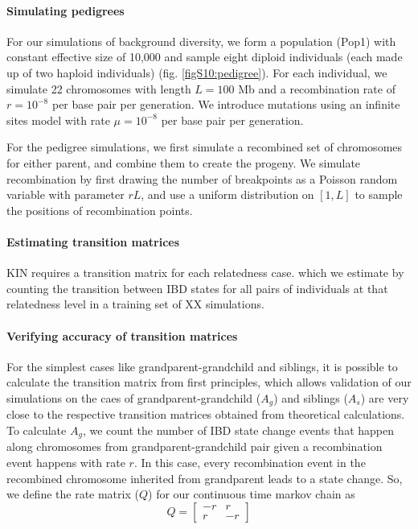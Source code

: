\documentclass[12pt, letterpaper]{article}
\begin{document}
\paragraph{Simulating pedigrees}

For our simulations of background diversity, we form a population (Pop1) with constant effective size of 10,000 and sample eight diploid individuals (each made up of two haploid individuals) (fig. \ref{figS10:pedigree}). For each individual, we simulate 22 chromosomes with length $L=100$ Mb and a recombination rate of $r=10^{-8}$ per base pair per generation. We introduce mutations using an infinite sites model with rate  $\mu= 10^{-8}$ per base pair per generation. 

For the pedigree simulations, we first simulate a recombined set of chromosomes for either parent, and combine them to create the progeny. We simulate recombination by first drawing the number of breakpoints as a  Poisson random variable with parameter $rL$, and use a uniform distribution on $[1, L]$ to sample the positions of recombination points. 

\paragraph{Estimating transition matrices}
KIN requires a transition matrix for each relatedness case. which we estimate  by counting the transition between IBD states for all pairs of individuals at that relatedness level in a training set of XX simulations.

\paragraph{Verifying accuracy of transition matrices}\label{A_ver}
For the simplest cases like grandparent-grandchild and siblings, it is possible to calculate the transition matrix from first principles, which allows validation of our simulations on the caes of grandparent-grandchild ($A_g$) and siblings ($A_s$) are very close to the respective transition matrices obtained from theoretical calculations. To calculate $A_g$, we count the number of IBD state change events that happen along chromosomes from grandparent-grandchild pair given a recombination event happens with rate $r$. In this case, every recombination event in the recombined chromosome inherited from grandparent leads to a state change. So, we define the rate matrix ($Q$) for our continuous time markov chain as $$Q = \left[\begin{array}
{rrr}
-r & r \\
r & -r 
\end{array}\right]$$   
\end{document}
